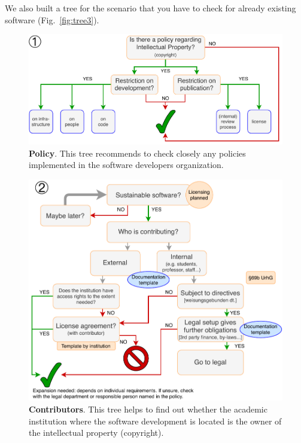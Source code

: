 \documentclass[a4paper,num-refs,numbers,sort&compress]{de-rse}
\begin{document}
We also built a tree for the scenario that you have to check for already existing software (Fig.~\ref{fig:tree3}).

\begin{figure}[h!]
  \centering
  \includegraphics[scale=0.5]{tree_IP_policy}
  \caption{\textbf{Policy}. This tree recommends to check closely any policies implemented in the software developers organization.}
  \label{fig:tree0}
\end{figure}

\begin{figure}[h!]
  \centering
  \includegraphics[scale=0.5]{figures/tree_sustainable_software}
  \caption{\textbf{Contributors}. This tree helps to find out whether the academic institution where the software development is located is the owner of the intellectual property (copyright).}
  \label{fig:tree1}
\end{figure}
\end{document}
